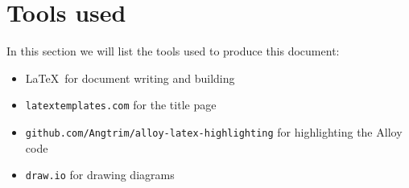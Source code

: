 \documentclass[../DD0.tex]{subfiles}
\begin{document}
\section*{Tools used}
\label{sec:tools}

  In this section we will list the tools used to produce this document:
  \begin{itemize}
    \item \LaTeX\ for document writing and building
    \item \texttt{latextemplates.com} for the title page
    \item \texttt{github.com/Angtrim/alloy-latex-highlighting} for highlighting the Alloy code
    \item \texttt{draw.io} for drawing diagrams
  \end{itemize}
\end{document}
